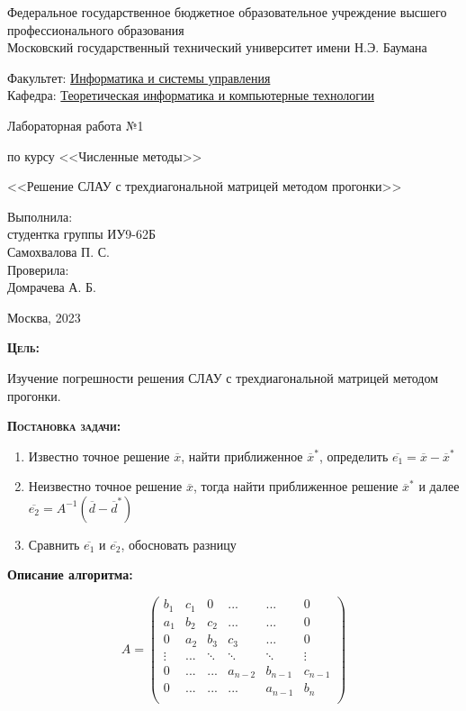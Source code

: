 \documentclass [12pt]{article}
\title{}
\date{}
\author{}
\begin{document}
\begin{titlepage}
\thispagestyle{empty}
\begin{center}
Федеральное государственное бюджетное образовательное учреждение высшего профессионального образования \\Московский государственный технический университет имени Н.Э. Баумана

\end{center}
\bigskip
\begin{flushleft}
Факультет: \underline{Информатика и системы управления}\\
Кафедра: \underline{Теоретическая информатика и компьютерные технологии}
\end{flushleft}
\vfill
\centerline{\large{Лабораторная работа №1}}
\centerline{\large{по курсу <<Численные методы>>}}
\centerline{\large{<<Решение СЛАУ с трехдиагональной матрицей методом прогонки>>}}
\vfill
\hfill\parbox{5cm} {
           Выполнила:\\
           студентка группы ИУ9-62Б \hfill \\
           Самохвалова П. С.\hfill \medskip\\
           Проверила:\\
           Домрачева А. Б.\hfill
       }
\centerline{Москва, 2023}
\clearpage
\end{titlepage}

\textsc{\textbf{Цель:}}

Изучение погрешности решения СЛАУ с трехдиагональной матрицей методом прогонки.

\textsc{\textbf{Постановка задачи:}}

\begin{enumerate}
    \item Известно точное решение $\overline{x}$, найти приближенное $\overline{x}^{*}$, определить $\overline{e_1} = \overline{x} - \overline{x}^{*}$
    \item Неизвестно точное решение $\overline{x}$, тогда найти приближенное решение $\overline{x}^{*}$ и далее $\overline{e_2} = A^{-1}(\overline{d} - \overline{d}^{*})$
    \item Сравнить $\overline{e_1}$ и $\overline{e_2}$, обосновать разницу
\end{enumerate}

\textbf{Описание алгоритма:}

$$ A=\left(\begin{array}{cccccc}
b_1 & c_1 & 0 & ... & ... &  0 \\
a_1 & b_2 & c_2 & ... & ... &  0 \\
0 & a_2 & b_3 & c_3 & ... &  0 \\
\vdots & ... & \ddots & \ddots & \ddots &  \vdots \\
0 & ... & ... & a_{n-2} & b_{n-1} & c_{n-1} \\
0 & ... & ... & ... & a_{n-1} & b_n \\
\end{array}\right) $$
\end{document}

